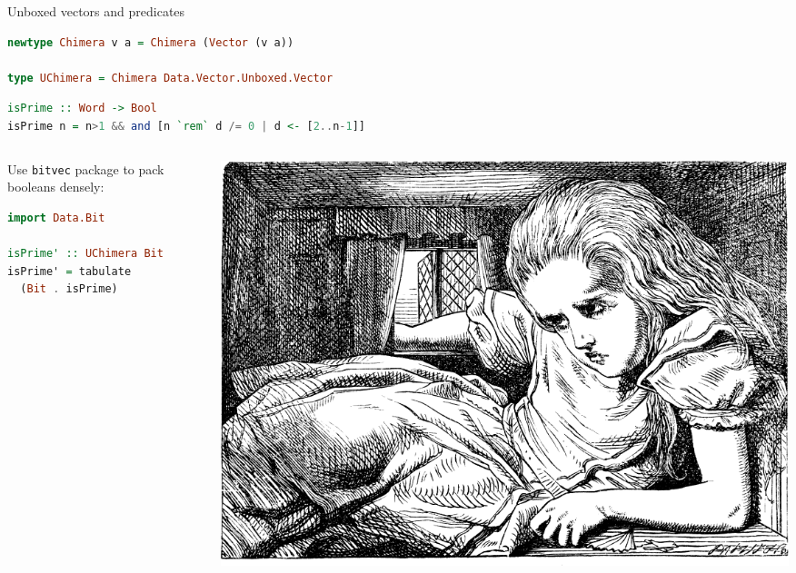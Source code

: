 \documentclass[handout]{beamer}
\begin{document}
\begin{frame}[fragile]{Unboxed vectors and predicates}

\begin{lstlisting}[language=Haskell]
newtype Chimera v a = Chimera (Vector (v a))

type UChimera = Chimera Data.Vector.Unboxed.Vector
\end{lstlisting}

\begin{lstlisting}[language=Haskell]
isPrime :: Word -> Bool
isPrime n = n>1 && and [n `rem` d /= 0 | d <- [2..n-1]]
\end{lstlisting}

\begin{columns}[T]
  \begin{column}{.45\textwidth}

Use {\tt bitvec} package to pack booleans densely:

\begin{lstlisting}[language=Haskell]
import Data.Bit

isPrime' :: UChimera Bit
isPrime' = tabulate
  (Bit . isPrime)
\end{lstlisting}

\end{column}

\begin{column}{.55\textwidth}
  \vspace{1.6ex}

  \includegraphics[width=1.11\textwidth]{boxed-alice.png}
\end{column}

\end{columns}

\end{frame}
\end{document}
